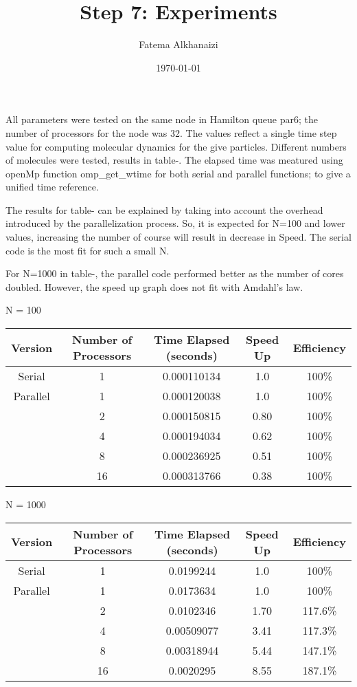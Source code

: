 \documentclass[11pt]{article}
\title{Step 7: Experiments}
\author{Fatema Alkhanaizi}
\date{\today}
\begin{document}
    \maketitle
    All parameters were tested on the same node in Hamilton queue par6; the number of processors for the node was 32. The values reflect a single time step value for computing molecular dynamics for the give particles. Different numbers of molecules were tested, results in table-. The elapsed time was meatured using openMp function omp\_get\_wtime for both serial and parallel functions; to give a unified time reference. 
    
    The results for table- can be explained by taking into account the overhead introduced by the parallelization process. So, it is expected for N=100 and lower values, increasing the number of course will result in decrease in Speed. The serial code is the most fit for such a small N. 

    For N=1000 in table-, the parallel code performed better as the number of cores doubled. However, the speed up graph does not fit with Amdahl's law. 

    N = 100
    \begin{tabular}{|c|c|c|c|c|}
        \hline
        Version & Number of Processors & Time Elapsed (seconds) & Speed Up & Efficiency \\
        \hline
        Serial & 1 & 0.000110134 & 1.0 & 100\% \\
        \hline
        Parallel & 1 & 0.000120038 & 1.0 & 100\% \\
                 & 2 & 0.000150815 & 0.80 & 100\% \\
                 & 4 & 0.000194034 & 0.62 & 100\% \\
                 & 8 & 0.000236925 & 0.51 & 100\% \\
                 & 16 & 0.000313766 & 0.38 & 100\% \\
        \hline
    \end{tabular}

    N = 1000
    \begin{tabular}{|c|c|c|c|c|}
        \hline
        Version & Number of Processors & Time Elapsed (seconds) & Speed Up & Efficiency \\
        \hline
        Serial & 1 & 0.0199244 & 1.0 & 100\% \\
        \hline
        Parallel & 1 & 0.0173634 & 1.0 & 100\% \\
                 & 2 & 0.0102346 & 1.70 & 117.6\% \\
                 & 4 & 0.00509077 & 3.41 & 117.3\% \\
                 & 8 & 0.00318944 & 5.44 & 147.1\% \\
                 & 16 & 0.0020295 & 8.55 & 187.1\% \\
        \hline
    \end{tabular}
\end{document}

